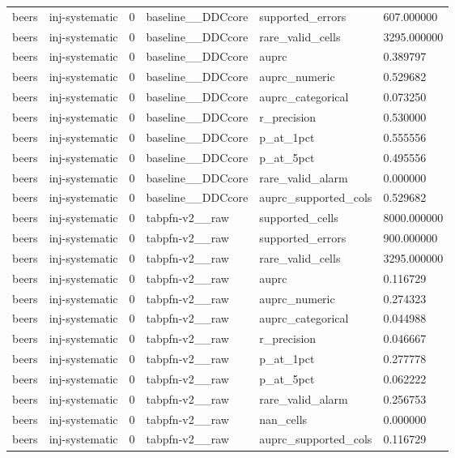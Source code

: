 \begin{tabular}{llllll}
beers & inj-systematic & 0 & baseline\_\_DDCcore & supported\_errors & 607.000000 \\
beers & inj-systematic & 0 & baseline\_\_DDCcore & rare\_valid\_cells & 3295.000000 \\
beers & inj-systematic & 0 & baseline\_\_DDCcore & auprc & 0.389797 \\
beers & inj-systematic & 0 & baseline\_\_DDCcore & auprc\_numeric & 0.529682 \\
beers & inj-systematic & 0 & baseline\_\_DDCcore & auprc\_categorical & 0.073250 \\
beers & inj-systematic & 0 & baseline\_\_DDCcore & r\_precision & 0.530000 \\
beers & inj-systematic & 0 & baseline\_\_DDCcore & p\_at\_1pct & 0.555556 \\
beers & inj-systematic & 0 & baseline\_\_DDCcore & p\_at\_5pct & 0.495556 \\
beers & inj-systematic & 0 & baseline\_\_DDCcore & rare\_valid\_alarm & 0.000000 \\
beers & inj-systematic & 0 & baseline\_\_DDCcore & auprc\_supported\_cols & 0.529682 \\
beers & inj-systematic & 0 & tabpfn-v2\_\_raw & supported\_cells & 8000.000000 \\
beers & inj-systematic & 0 & tabpfn-v2\_\_raw & supported\_errors & 900.000000 \\
beers & inj-systematic & 0 & tabpfn-v2\_\_raw & rare\_valid\_cells & 3295.000000 \\
beers & inj-systematic & 0 & tabpfn-v2\_\_raw & auprc & 0.116729 \\
beers & inj-systematic & 0 & tabpfn-v2\_\_raw & auprc\_numeric & 0.274323 \\
beers & inj-systematic & 0 & tabpfn-v2\_\_raw & auprc\_categorical & 0.044988 \\
beers & inj-systematic & 0 & tabpfn-v2\_\_raw & r\_precision & 0.046667 \\
beers & inj-systematic & 0 & tabpfn-v2\_\_raw & p\_at\_1pct & 0.277778 \\
beers & inj-systematic & 0 & tabpfn-v2\_\_raw & p\_at\_5pct & 0.062222 \\
beers & inj-systematic & 0 & tabpfn-v2\_\_raw & rare\_valid\_alarm & 0.256753 \\
beers & inj-systematic & 0 & tabpfn-v2\_\_raw & nan\_cells & 0.000000 \\
beers & inj-systematic & 0 & tabpfn-v2\_\_raw & auprc\_supported\_cols & 0.116729 \\

\end{tabular}
